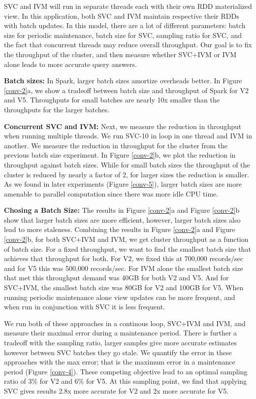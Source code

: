 SVC and IVM will run in separate threads each with their own RDD materialized view.
In this application, both SVC and IVM maintain respective their RDDs with batch updates.
In this model, there are a lot of different parameters: batch size for periodic maintenance, batch size for SVC, sampling ratio for SVC, and the fact that concurrent threads may reduce overall throughput.
Our goal is to fix the throughput of the cluster, and then measure whether SVC+IVM or IVM alone leads to more accurate query answers.

\textbf{Batch sizes:} In Spark, larger batch sizes amortize overheads better.
In Figure \ref{conv-2}a, we show a tradeoff between batch size and throughput of Spark for V2 and V5.
Throughputs for small batches are nearly 10x smaller than the throughputs for the larger batches. 

\textbf{Concurrent SVC and IVM:} Next, we measure the reduction in throughput when running multiple threads.
We run SVC-10 in loop in one thread and IVM in another.
We measure the reduction in throughput for the cluster from the previous batch size experiment.
In Figure \ref{conv-2}b, we plot the reduction in throughput against batch sizes.
While for small batch sizes the throughput of the cluster is reduced by nearly a factor of 2, for larger sizes the reduction is
smaller.
As we found in later experiments (Figure \ref{conv-5}), larger batch sizes are more amenable to parallel computation since there was more idle CPU time.

\textbf{Chosing a Batch Size:}
The results in Figure \ref{conv-2}a and Figure \ref{conv-2}b show that larger batch sizes are more efficient, however, larger batch sizes also lead to more staleness.
Combining the results in Figure \ref{conv-2}a and Figure \ref{conv-2}b, for both SVC+IVM and IVM, we get cluster throughput as a function of batch size.
For a fixed throughput, we want to find the smallest batch size that achieves that throughput for both.
For V2, we fixed this at 700,000 records/sec and for V5 this was 500,000 records/sec.
For IVM alone the smallest batch size that met this throughput demand was 40GB for both V2 and V5.
And for SVC+IVM, the smallest batch size was 80GB for V2 and 100GB for V5.
When running periodic maintenance alone view updates can be more frequent, and when run in conjunction with SVC it is less frequent. 

We run both of these approaches in a continous loop, SVC+IVM and IVM, and measure their maximal error during a maintenance period.
There is further a tradeoff with the sampling ratio, larger samples give more accurate estimates however between SVC batches they go stale.
We quantify the error in these approaches with the max error; that is the maximum error in a maintenance period (Figure \ref{conv-4}).
These competing objective lead to an optimal sampling ratio of 3\% for V2 and 6\% for V5.
At this sampling point, we find that applying SVC gives results 2.8x more accurate for V2 and 2x more accurate for V5.


